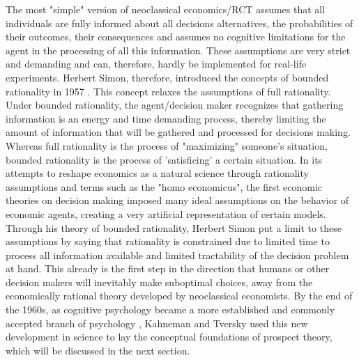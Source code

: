 \noindent
The most "simple" version of neoclassical economics/RCT assumes that all individuals are fully informed about all decisions alternatives, the probabilities of their outcomes, their consequences and assumes no cognitive limitations for the agent in the processing of all this information. These assumptions are very strict and demanding and can, therefore, hardly be implemented for real-life experiments. Herbert Simon, therefore, introduced the concepts of bounded rationality in 1957 \cite{boundedrat}. This concept relaxes the assumptions of full rationality. Under bounded rationality, the agent/decision maker recognizes that gathering information is an energy and time demanding process, thereby limiting the amount of information that will be gathered and processed for decisions making. Whereas full rationality is the process of "maximizing" someone's situation, bounded rationality is the process of 'satisficing' a certain situation. 
\newline \newline \noindent
In its attempts to reshape economics as a natural science through rationality assumptions and terms such as the "homo economicus", the first economic theories on decision making imposed many ideal assumptions on the behavior of economic agents, creating a very artificial representation of certain models. Through his theory of bounded rationality, Herbert Simon put a limit to these assumptions by saying that rationality is constrained due to limited time to process all information available and limited tractability of the decision problem at hand. This already is the first step in the direction that humans or other decision makers will inevitably make suboptimal choices, away from the economically rational theory developed by neoclassical economists. By the end of the 1960s, as cognitive psychology became a more established and commonly accepted branch of psychology \cite{cognitive}, Kahneman and Tversky used this new development in science to lay the conceptual foundations of prospect theory, which will be discussed in the next section.
